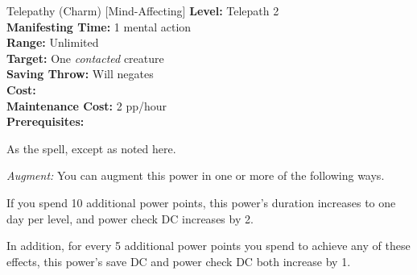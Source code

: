 {Telepathy (Charm) [Mind-Affecting]}
{
	\textbf{Level:}
	Telepath 2\\
	\textbf{Manifesting Time:}
	1 mental action\\
	\textbf{Range:}
	Unlimited\\
	\textbf{Target:}
	One \emph{contacted} creature\\
	\textbf{Saving Throw:}
	Will negates\\
	\textbf{Cost:}
	\\
	\textbf{Maintenance Cost:}
	2 pp/hour\\
	\textbf{Prerequisites:}
	\\
}
{
	As the  spell, except as noted here.

	\textit{Augment:} You can augment this power in one or more of the following ways.
	\begin{itemize*}
	\item If you spend 10 additional power points, this power's duration increases to one day per level, and power check DC increases by 2.
	\item In addition, for every 5 additional power points you spend to achieve any of these effects, this power's save DC and power check DC both increase by 1.
	\end{itemize*}
}